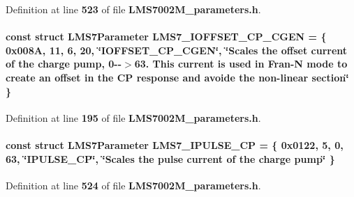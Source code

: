 Definition at line {\bf 523} of file {\bf L\+M\+S7002\+M\+\_\+parameters.\+h}.

\paragraph[{L\+M\+S7\+\_\+\+I\+O\+F\+F\+S\+E\+T\+\_\+\+C\+P\+\_\+\+C\+G\+EN}]{\setlength{\rightskip}{0pt plus 5cm}const struct {\bf L\+M\+S7\+Parameter} L\+M\+S7\+\_\+\+I\+O\+F\+F\+S\+E\+T\+\_\+\+C\+P\+\_\+\+C\+G\+EN = \{ 0x008\+A, 11, 6, 20, \char`\"{}\+I\+O\+F\+F\+S\+E\+T\+\_\+\+C\+P\+\_\+\+C\+G\+E\+N\char`\"{}, \char`\"{}\+Scales the offset current of the charge pump, 0-\/-\/$>$63. This current is used in Fran-\/\+N mode to create an offset in the C\+P response and avoide the non-\/linear section\char`\"{} \}\hspace{0.3cm}{\ttfamily [static]}}\label{LMS7002M__parameters_8h_a7fae8e1f51655f340ad1d847cb9024e7}


Definition at line {\bf 195} of file {\bf L\+M\+S7002\+M\+\_\+parameters.\+h}.

\paragraph[{L\+M\+S7\+\_\+\+I\+P\+U\+L\+S\+E\+\_\+\+CP}]{\setlength{\rightskip}{0pt plus 5cm}const struct {\bf L\+M\+S7\+Parameter} L\+M\+S7\+\_\+\+I\+P\+U\+L\+S\+E\+\_\+\+CP = \{ 0x0122, 5, 0, 63, \char`\"{}\+I\+P\+U\+L\+S\+E\+\_\+\+C\+P\char`\"{}, \char`\"{}\+Scales the pulse current of the charge pump\char`\"{} \}\hspace{0.3cm}{\ttfamily [static]}}\label{LMS7002M__parameters_8h_a0e6c98883965096cb2f02dd32c077c20}


Definition at line {\bf 524} of file {\bf L\+M\+S7002\+M\+\_\+parameters.\+h}.

